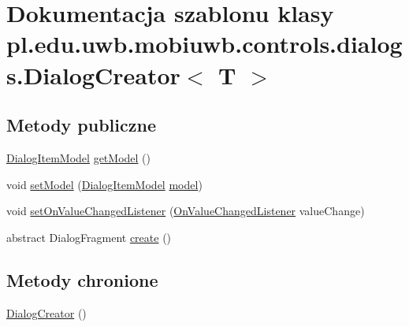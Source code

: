 \hypertarget{classpl_1_1edu_1_1uwb_1_1mobiuwb_1_1controls_1_1dialogs_1_1_dialog_creator}{}\section{Dokumentacja szablonu klasy pl.\+edu.\+uwb.\+mobiuwb.\+controls.\+dialogs.\+Dialog\+Creator$<$ T $>$}
\label{classpl_1_1edu_1_1uwb_1_1mobiuwb_1_1controls_1_1dialogs_1_1_dialog_creator}
\subsection*{Metody publiczne}
\begin{DoxyCompactItemize}
\item 
\hyperlink{classpl_1_1edu_1_1uwb_1_1mobiuwb_1_1view_1_1settings_1_1adapter_1_1items_1_1dialog_1_1_dialog_item_model}{Dialog\+Item\+Model} \hyperlink{classpl_1_1edu_1_1uwb_1_1mobiuwb_1_1controls_1_1dialogs_1_1_dialog_creator_ae9741ce587f8eeccb65f3fefbfd48e23}{get\+Model} ()
\item 
void \hyperlink{classpl_1_1edu_1_1uwb_1_1mobiuwb_1_1controls_1_1dialogs_1_1_dialog_creator_aa39b845a8f46b012e80b919464489f9d}{set\+Model} (\hyperlink{classpl_1_1edu_1_1uwb_1_1mobiuwb_1_1view_1_1settings_1_1adapter_1_1items_1_1dialog_1_1_dialog_item_model}{Dialog\+Item\+Model} \hyperlink{classpl_1_1edu_1_1uwb_1_1mobiuwb_1_1controls_1_1dialogs_1_1_dialog_creator_a3a75c0177796683d1ea9fc8580f48262}{model})
\item 
void \hyperlink{classpl_1_1edu_1_1uwb_1_1mobiuwb_1_1controls_1_1dialogs_1_1_dialog_creator_a0aa726540026268dfc600db661f27a6f}{set\+On\+Value\+Changed\+Listener} (\hyperlink{interfacepl_1_1edu_1_1uwb_1_1mobiuwb_1_1interfaces_1_1_on_value_changed_listener}{On\+Value\+Changed\+Listener} value\+Change)
\item 
abstract Dialog\+Fragment \hyperlink{classpl_1_1edu_1_1uwb_1_1mobiuwb_1_1controls_1_1dialogs_1_1_dialog_creator_aa73fbf16b4fedb453ee236e617aea452}{create} ()
\end{DoxyCompactItemize}
\subsection*{Metody chronione}
\begin{DoxyCompactItemize}
\item 
\hyperlink{classpl_1_1edu_1_1uwb_1_1mobiuwb_1_1controls_1_1dialogs_1_1_dialog_creator_a39eb11bad2f2b39125d2dd5d08280b42}{Dialog\+Creator} ()
\end{DoxyCompactItemize}
